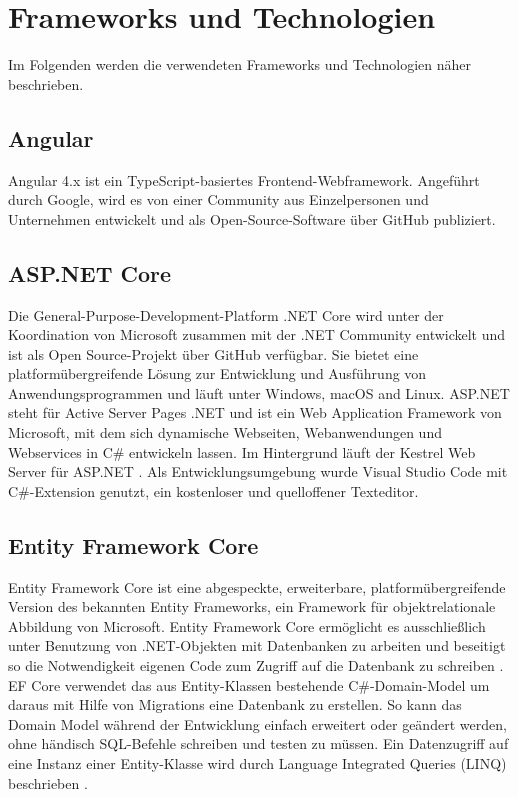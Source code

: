 \section{Frameworks und Technologien}

Im Folgenden werden die verwendeten Frameworks und Technologien näher beschrieben.

\subsection{Angular}

Angular 4.x \cite{angular} ist ein TypeScript-basiertes Frontend-Webframework. Angeführt durch Google, wird es von einer Community aus Einzelpersonen und Unternehmen entwickelt und als Open-Source-Software über GitHub \cite{angularGit} publiziert.


\subsection{ASP.NET Core}

Die General-Purpose-Development-Platform .NET Core wird unter der Koordination von Microsoft zusammen mit der .NET Community entwickelt und ist als Open Source-Projekt über GitHub \cite{dotnetcore} verfügbar. Sie bietet eine platformübergreifende Lösung zur Entwicklung und Ausführung von Anwendungsprogrammen und läuft unter Windows, macOS and Linux. ASP.NET steht für Active Server Pages .NET und ist ein Web Application Framework von Microsoft, mit dem sich dynamische Webseiten, Webanwendungen und Webservices in C\# entwickeln lassen. Im Hintergrund läuft der Kestrel Web Server für ASP.NET \cite{kestrel}. Als Entwicklungsumgebung wurde Visual Studio Code mit C\#-Extension genutzt, ein kostenloser und quelloffener Texteditor.


\subsection{Entity Framework Core}

Entity Framework Core ist eine abgespeckte, erweiterbare, platformübergreifende Version des bekannten Entity Frameworks, ein Framework für objektrelationale Abbildung von Microsoft. Entity Framework Core ermöglicht es ausschließlich unter Benutzung von .NET-Objekten mit Datenbanken zu arbeiten und beseitigt so die Notwendigkeit eigenen Code zum Zugriff auf die Datenbank zu schreiben \cite{msentitiyframework}. EF Core verwendet das aus Entity-Klassen bestehende C\#-Domain-Model um daraus mit Hilfe von Migrations eine Datenbank zu erstellen. So kann das Domain Model während der Entwicklung einfach erweitert oder geändert werden, ohne händisch SQL-Befehle schreiben und testen zu müssen. Ein Datenzugriff auf eine Instanz einer Entity-Klasse wird durch Language Integrated Queries (LINQ) beschrieben \cite{dotnetcore}.



